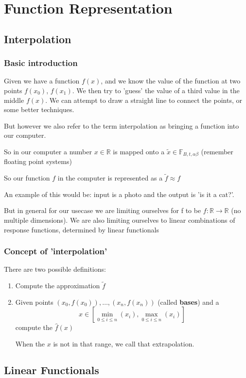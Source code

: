\documentclass{article}
\begin{document}
\section{Function Representation}
\subsection{Interpolation}

\subsubsection{Basic introduction}
Given we have a function $f(x)$, and we know the value of the function at two points $f(x_0)$, $f(x_1)$. We then try to 'guess' the value of a third value in the middle $f(x)$. We can attempt to draw a straight line to connect the points, or some better techniques.

But however we also refer to the term interpolation as bringing a function into our computer.

So in our computer a number $x\in\mathbb{R}$ is mapped onto a $\tilde{x}\in\mathbb{F}_{B,t,\alpha\beta}$ (remember floating point systems)

So our function $f$ in the computer is represented as a $\tilde{f} \approx f$

An example of this would be: input is a photo and the output is 'is it a cat?'.

But in general for our usecase we are limiting ourselves for f to be $f:\mathbb{R}\to\mathbb{R}$ (no multiple dimensions). We are also limiting ourselves to linear combinations of response functions, determined by
linear functionals

\subsubsection{Concept of 'interpolation'}
There are two possible definitions:
\begin{enumerate}
  \item Compute the approximation $\tilde{f}$
  \item Given points $(x_0,f(x_0)),\dots,(x_n,f(x_n))$ (called \textbf{bases}) and a 
  \[x \in \left[\min_{0\leq i \leq n}(x_i) , \max_{0\leq i \leq n}(x_i)\right]\]
  compute the $\hat{f}(x)$

  When the $x$ is not in that range, we call that extrapolation.
\end{enumerate}

\subsection{Linear Functionals}
\end{document}
